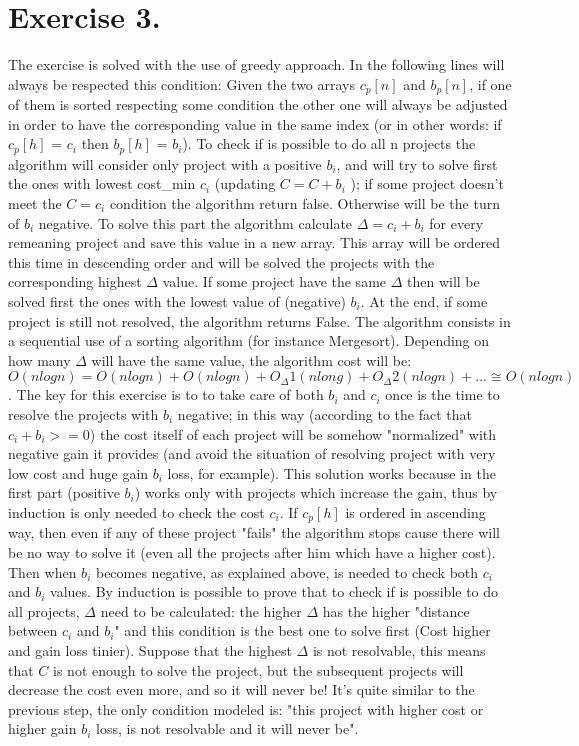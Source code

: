 \documentclass[11pt]{scrartcl}
\begin{document}
\section*{Exercise 3.} The exercise is solved with the use of greedy approach. In the following lines will always be respected this condition: Given the two arrays $c_p[n]$ and $b_p[n]$, if one of them is sorted respecting some condition the other one will always be adjusted in order to have the corresponding value in the same index (or in other words: if $c_p[h]$ = $c_i$ then $b_p[h]$ = $b_i$). To check if is possible to do all n projects the algorithm will consider only project with a positive $b_i$, and will try to solve first the ones with lowest cost\_min $c_i$ (updating $C= C + b_i$ ); if some project doesn't meet the $C=c_i$ condition the algorithm return false. Otherwise will be the turn of $b_i$ negative. To solve this part the algorithm calculate $\Delta = c_i + b_i$ for every remeaning project and save this value in a new array. This array will be ordered this time in descending order and will be solved the projects with the corresponding highest $\Delta$ value. If some project have the same $\Delta$ then will be solved first the ones with the lowest value of (negative) $b_i$. At the end, if some project is still not resolved, the algorithm returns False.
\newline
The algorithm consists in a sequential use of a sorting algorithm (for instance Mergesort). Depending on how many $\Delta$ will have the same value, the algorithm cost will be: \textit{$O(nlogn) = O(nlogn) + O(nlogn) + O_\Delta1 (nlong) + O_\Delta2(nlogn) + ...  \cong O(nlogn)$}. The key for this exercise is to to take care of both $b_i$ and $c_i$ once is the time to resolve the projects with $b_i$ negative; in this way (according to the fact that $c_i + b_i >= 0$) the cost itself of each project will be somehow "normalized" with negative gain it provides (and avoid the situation of resolving project with very low cost and huge gain $b_i$ loss, for example). \newline
This solution works because in the first part (positive $b_i$) works only with projects which increase the gain, thus by induction is only needed to check the cost $c_i$. If $c_p[h]$ is ordered in ascending way, then even if any of these project "fails" the algorithm stops cause there will be no way to solve it (even all the projects after him which have a higher cost). Then when $b_i$ becomes negative, as explained above, is needed to check both $c_i$ and $b_i$ values. By induction is possible to prove that to check if is possible to do all projects, $\Delta$ need to be calculated: the higher $\Delta$ has the higher "distance between $c_i$ and $b_i$" and this condition is the best one to solve first (Cost higher and gain loss tinier). Suppose that the highest $\Delta$ is not resolvable, this means that $C$ is not enough to solve the project, but the subsequent projects will decrease the cost even more, and so it will never be! It's quite similar to the previous step, the only condition modeled is: "this project with higher cost or higher gain $b_i$ loss, is not resolvable and it will never be".
\end{document}
